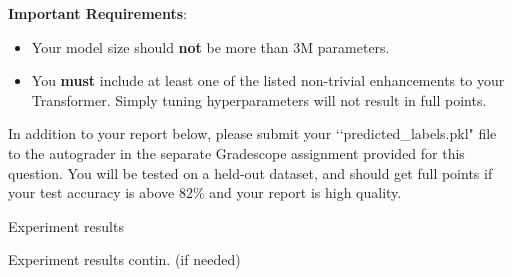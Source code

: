 \begin{enumerate}
    \textbf{Important Requirements}: 
     \begin{itemize}
        \item Your model size should \textbf{not} be more than 3M parameters. 
        \item You \textbf{must} include at least one of the listed non-trivial enhancements to your Transformer. Simply tuning hyperparameters will not result in full points.
    \end{itemize}

    In addition to your report below, please submit your ‘‘predicted\_labels.pkl" file to the autograder in the separate Gradescope assignment provided for this question. You will be tested on a held-out dataset, and should get full points if your test accuracy is above 82\% and your report is high quality.  
    
    \begin{tcolorbox}[fit,height=18cm, width=15cm, blank, borderline={1pt}{-2pt}]
\begin{answer}
        Experiment results %
\end{answer}
    \end{tcolorbox}
    \begin{tcolorbox}[fit,height=20cm, width=15cm, blank, borderline={1pt}{-2pt}]
\begin{answer}
        Experiment results contin. (if needed) %
        
\end{answer}
    \end{tcolorbox}
    
    
\end{enumerate}
